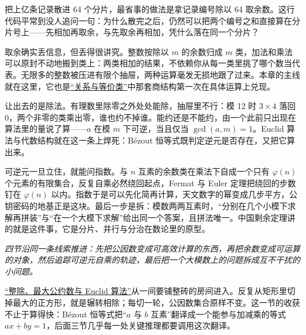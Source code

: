 把上亿条记录散进 64 个分片，最省事的做法是拿记录编号除以 64 取余数。这行代码平常到没人追问一句：为什么散完之后，仍然可以把两个编号之和直接算在分片号上——先相加再取余，与先取余再相加，凭什么落在同一个分片？

取余确实丢信息，但丢得很讲究。整数按除以 \(m\) 的余数归成 \(m\) 类，加法和乘法可以原封不动地搬到类上：两类相加的结果，不依赖你从每一类里挑了哪个数当代表。无限多的整数被压进有限个抽屉，两种运算毫发无损地跟了过来。本章的主线就在这里，它也是\hyperref[sec:01-Mathematical-Language/02-Sets-Relations-Functions/02]{``关系与等价类''}中那套商结构第一次在具体运算上兑现。

让出去的是除法。有理数里除零之外处处能除，抽屉里不行：模 12 时 \(3\times4\) 落回 0，两个非零的类乘出零，谁也约不掉谁。能约还是不能约，由一个此前只出现在算法里的量说了算——\(a\) 在模 \(m\) 下可逆，当且仅当 \(\gcd(a,m)=1\)。Euclid 算法与代数结构就在这一条上焊死：Bézout 恒等式既判定逆元是否存在，又把它算出来。

可逆元一旦立住，就能问指数。与 \(n\) 互素的余数类在乘法下自成一个只有 \(\varphi(n)\) 个元素的有限集合，反复自乘必然绕回起点，Fermat 与 Euler 定理把绕回的步数钉在 \(\varphi(n)\) 以内。指数于是可以先化简再计算，天文数字的幂变成几步平方，公钥密码的地基正是这块。最后一步是拆：模数两两互素时，``分别在几个小模下求解再拼装''与``在一个大模下求解''给出同一个答案，且拼法唯一。中国剩余定理讲的就是这件事，它是分片、并行与分治在数论里的原型。

\begin{center}

\emph{四节沿同一条线索推进：先把公因数变成可高效计算的东西，再把余数变成可运算的对象，然后追踪可逆元自乘的轨迹，最后把一个大模数上的问题拆成互不干扰的小问题。}
\end{center}

\hyperref[sec:04-Discrete-Mathematics/04-Number-Theory/01]{``整除、最大公约数与 Euclid 算法''}从一间要铺整砖的房间进入。反复从矩形里切掉最大的正方形，就是辗转相除；每切一轮，公因数集合原样不变。这一节的收获不止于算得快：Bézout 恒等式把``\(a\) 与 \(b\) 互素''翻译成一个能参与加减乘的等式 \(ax+by=1\)，后面三节几乎每一处关键推理都要调用这次翻译。

